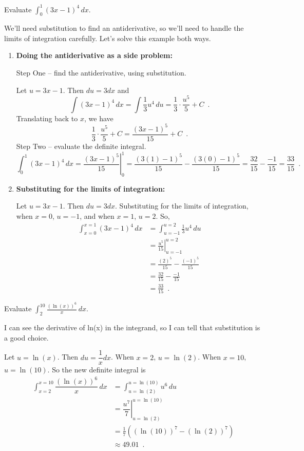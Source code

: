 \begin{example}
Evaluate $\displaystyle\int_0^1(3x-1)^4\,dx$.

\begin{solution}
We'll need substitution to find an antiderivative, so we'll need to handle the limits of integration carefully. Let's solve this example both ways.
  \begin{enumerate}
    \item {\bf Doing the antiderivative as a side problem:}

    Step One -- find the antiderivative, using substitution.

    Let $u=3x-1$. Then $du=3dx$ and
    $$\int (3x-1)^4\,dx = \int \dfrac{1}{3}u^4\,du = \dfrac{1}{3}\cdot\dfrac{u^5}{5}+C \enspace .$$
Translating back to $x$, we have
    $$\dfrac{1}{3}\cdot\dfrac{u^5}{5} + C = \dfrac{(3x-1)^5}{15} + C \enspace .$$
Step Two -- evaluate the definite integral.
  $$\int_0^1(3x-1)^4\,dx = \left.\dfrac{(3x-1)^5}{15}\right|_0^1 = \dfrac{(3(1)-1)^5}{15} - \dfrac{(3(0)-1)^5}{15} = \dfrac{32}{15}-\dfrac{-1}{15} = \dfrac{33}{15} \enspace .$$

  \item {\bf Substituting for the limits of integration:}

  Let $u=3x-1$. Then $du=3dx$. Substituting for the limits of integration, when $x=0$, $u=-1$, and when $x=1$, $u=2$. So,
  \begin{align*}
  \int_{x=0}^{x=1}(3x-1)^4\,dx &= \int_{u=-1}^{u=2}\frac{1}{3}u^4\,du \\
    &= \left.\frac{u^5}{15}\right|_{u=-1}^{u=2} \\
    &= \frac{(2)^5}{15} - \frac{(-1)^5}{15}\\
    &= \frac{32}{15} - \frac{-1}{15} \\
    &= \frac{33}{15} \enspace .
  \end{align*}
\end{enumerate}
\end{solution}\end{example}

\begin{example}
Evaluate $\displaystyle\int_2^{10}\frac{(\ln(x))^6}{x}\,dx$.

\begin{solution}
  I can see the derivative of ln(x) in the integrand, so I can tell that substitution is a good choice.

Let $u=\ln(x)$. Then $du = \dfrac{1}{x}dx$. When $x=2$, $u=\ln(2)$. When $x=10$, $u=\ln(10)$. So the new definite integral is
  \begin{align*}
    \int_{x=2}^{x=10}\dfrac{(\ln(x))^6}{x}\,dx &= \int_{u=\ln(2)}^{u=\ln(10)}u^6\,du \\
    &= \left.\dfrac{u^7}{7}\right|_{u=\ln(2)}^{u=\ln(10)}\\
    &= \frac{1}{7}\left((\ln(10))^7-(\ln(2))^7\right)\\
    &\approx 49.01 \enspace .
  \end{align*}
\end{solution}\end{example}
